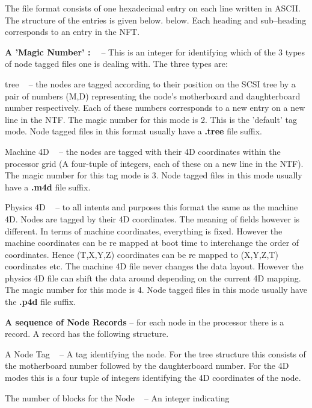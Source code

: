 The file format consists of one hexadecimal entry on each line 
written in ASCII. The structure of the entries is given below.
below. Each heading and sub--heading corresponds to an entry 
in the NFT.
\begin{description}
\item{\bf A 'Magic Number' : \ } -- This is an integer for identifying
which of the 3 types of node tagged files one is dealing with. The
three types are: \begin{description} \item{tree \ } -- the nodes are
tagged according to their position on the SCSI tree by a pair of
numbers (M,D) representing the node's motherboard and daughterboard
number respectively. Each of these numbers corresponds to a new entry
on a new line in the NTF. The magic number for this mode is 2.  This
is the 'default' tag mode. Node tagged files in this format usually
have a {\bf .tree} file suffix.  \item{Machine 4D \ } -- the nodes are
tagged with their 4D coordinates within the processor grid (A
four-tuple of integers, each of these on a new line in the NTF). The
magic number for this tag mode is 3. Node tagged files in this mode
usually have a {\bf .m4d} file suffix.  \item{Physics 4D \ } -- to all
intents and purposes this format the same as the machine 4D. Nodes are
tagged by their 4D coordinates. The meaning of fields however is
different. In terms of machine coordinates, everything is
fixed. However the machine coordinates can be re mapped at boot time to
interchange the order of coordinates. Hence (T,X,Y,Z) coordinates can
be re mapped to (X,Y,Z,T) coordinates etc. The machine 4D file never
changes the data layout. However the physics 4D file can shift the
data around depending on the current 4D mapping. The magic number for
this mode is 4. Node tagged files in this mode usually have the {\bf
.p4d} file suffix.  \end{description}
\item{\bf A sequence of Node Records} -- for each node in the processor there is
a record. A record has the following structure.
	\begin{description}
	\item{A Node Tag \ } -- A tag identifying the node. For the tree structure this consists of the  motherboard number followed by the daughterboard
number. For the 4D modes this is a four tuple of integers identifying the
4D coordinates of the node.
	\item{The number of blocks for the Node \ } -- An integer indicating

\end{description}
\end{description}
